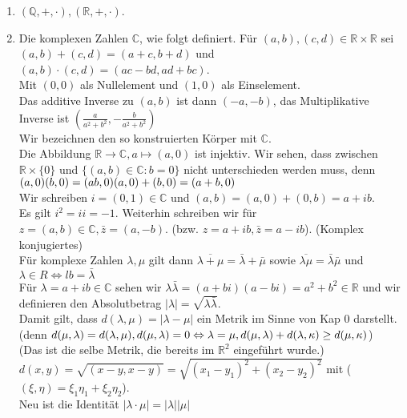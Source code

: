 \documentclass{article}
\newcommand{\lb}{\lambda}
\newcommand{\R}{\mathbb{R}}
\newcommand{\Q}{\mathbb{Q}}
\newcommand{\C}{\mathbb{C}}
\begin{document}
\begin{enumerate}
\item{$(\Q, +, \cdot), (\R, +, \cdot)$.}
\item{Die komplexen Zahlen $\C$, wie folgt definiert. Für $(a, b), (c, d) \in \R \times \R$ sei\\
$(a, b)+(c, d) = (a + c, b + d)$ und\\
$(a,b)\cdot (c,d) = (ac-bd, ad + bc)$.\\
Mit $(0, 0)$ als Nullelement und $(1, 0)$ als Einselement.\\
Das additive Inverse zu $(a, b)$ ist dann $(-a, -b)$, das Multiplikative Inverse ist $(\frac{a}{a^2+b^2}, -\frac{b}{a^2 + b^2})$\\
Wir bezeichnen den so konstruierten Körper mit $\C$.\\
Die Abbildung $\R \to \C, a \mapsto (a, 0)$ ist injektiv. Wir sehen, dass zwischen $\R \times \{0\}$ und $\{(a, b) \in \C : b = 0\}$ nicht unterschieden werden muss, denn \\
$
(a, 0) (b, 0) = (ab, 0)\\
(a, 0) + (b, 0) = (a+b, 0)
$\\
Wir schreiben $i = (0, 1) \in \C$ und $(a, b) = (a, 0) + (0, b) = a + ib$.\\
Es gilt $i^2 = ii = -1$. Weiterhin schreiben wir  für $z = (a, b) \in \C, \bar{z} = (a, -b)$. (bzw. $z = a + ib, \bar{z} = a - ib$). (Komplex konjugiertes)\\
Für komplexe Zahlen $\lb, \mu$ gilt dann $\overline{\lb + \mu} = \bar{\lb} + \bar{\mu}$ sowie $\overline{\lb \mu} = \bar{\lb}\bar{\mu}$ und $\lb \in R \Leftrightarrow lb = \bar{\lb}$\\
Für $\lb = a+ib \in \C$ sehen wir $\lb \bar{\lb} = (a + bi) (a - bi) = a^2 + b^2 \in \R$ und wir definieren den Absolutbetrag $|\lb| = \sqrt{\lb \bar{\lb}}$.\\
Damit gilt, dass $d(\lb, \mu) = |\lb - \mu|$ ein Metrik im Sinne von Kap 0 darstellt. (denn $d(\mu, \lb) = d(\lb, \mu),\\
d(\mu, \lb) = 0 \Leftrightarrow \lb = \mu,\\
d(\mu, \lb) + d(\lb, \kappa) \ge d(\mu, \kappa)$)\\
(Das ist die selbe Metrik, die bereits im $\R^2$ eingeführt wurde.)\\
$d(x, y) = \sqrt{(x - y, x - y)} = \sqrt{(x_1-y_1)^2 + (x_2 - y_2)^2}$ mit ($(\xi, \eta) = \xi_1 \eta_1 + \xi_2 \eta_2$).\\
Neu ist die Identität $|\lb \cdot \mu| = |\lb| |\mu|$\\
}
\end{enumerate}
\end{document}
